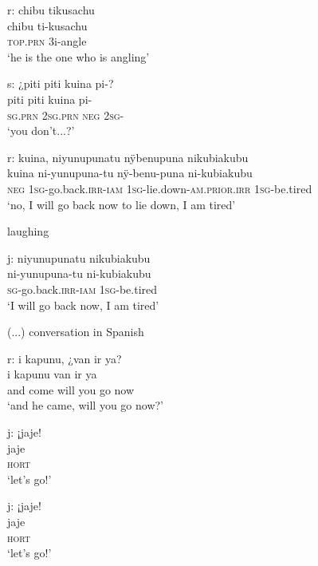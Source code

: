 \ea%
\begingl
\glpreamble \textup{r:} chibu tikusachu\\
\gla chibu ti-kusachu\\
\textsc{top.prn} 3i-angle\\
\glft ‘he is the one who is angling’
\endgl
\xe


\ea%
\begingl
\glpreamble \textup{s:} ¿piti piti kuina pi-?\\
\gla piti piti kuina pi-\\
\textsc{sg.prn} 2\textsc{sg.prn} \textsc{neg} 2\textsc{sg}-\\
\glft ‘you don’t...?’
\endgl
\xe


\ea%
\begingl
\glpreamble \textup{r:} kuina, niyunupunatu nÿbenupuna nikubiakubu\\
\gla kuina ni-yunupuna-tu nÿ-benu-puna ni-kubiakubu\\
\glb \textsc{neg} 1\textsc{sg}-go.back.\textsc{irr}-\textsc{iam} 1\textsc{sg}-lie.down-\textsc{am.prior.irr} 1\textsc{sg}-be.tired\\
\glft ‘no, I will go back now to lie down, I am tired’
\endgl
\xe

laughing

\ea%
\begingl
\glpreamble \textup{j:} niyunupunatu nikubiakubu\\
\gla ni-yunupuna-tu ni-kubiakubu\\
\textsc{sg}-go.back.\textsc{irr}-\textsc{iam} 1\textsc{sg}-be.tired\\
\glft ‘I will go back now, I am tired’
\endgl
\xe


(...) conversation in Spanish

\ea%
\begingl
\glpreamble \textup{r:} i kapunu, ¿van ir ya?\\
\gla i kapunu {van ir ya}\\
\glb and come {will you go now}\\
\glft ‘and he came, will you go now?’
\endgl
\xe

\ea%
\begingl
\glpreamble \textup{j:} ¡jaje!\\
\gla jaje\\
\glb \textsc{hort}\\
\glft ‘let’s go!’
\endgl
\xe

\ea%
\begingl
\glpreamble \textup{j:} ¡jaje!\\
\gla jaje\\
\glb \textsc{hort}\\
\glft ‘let’s go!’
\endgl
\xe

